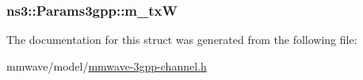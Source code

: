 \subsubsection[{\texorpdfstring{m\+\_\+txW}{m_txW}}]{ ns3\+::\+Params3gpp\+::m\+\_\+txW}\hypertarget{structns3_1_1Params3gpp_a7cadacd3315d352f1d7e91632caa9234}{}\label{structns3_1_1Params3gpp_a7cadacd3315d352f1d7e91632caa9234}


The documentation for this struct was generated from the following file\+:\begin{DoxyCompactItemize}
\item 
mmwave/model/\hyperlink{mmwave-3gpp-channel_8h}{mmwave-\/3gpp-\/channel.\+h}\end{DoxyCompactItemize}
